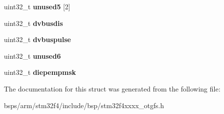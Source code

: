 \begin{DoxyCompactItemize}
uint32\+\_\+t {\bfseries unused5} \mbox{[}2\mbox{]}
\item 
\mbox{\label{structstm32f4__otgfs__dregs__s_a3c600dc5dee45519ea02933d0f11ecda}} 
uint32\+\_\+t {\bfseries dvbusdis}
\item 
\mbox{\label{structstm32f4__otgfs__dregs__s_a086f6898e012a6bb101da80a6026ea97}} 
uint32\+\_\+t {\bfseries dvbuspulse}
\item 
\mbox{\label{structstm32f4__otgfs__dregs__s_a883911a25814def8278ada556d39a34b}} 
uint32\+\_\+t {\bfseries unused6}
\item 
\mbox{\label{structstm32f4__otgfs__dregs__s_aa253fdebfd1b73046aad44cc9585296d}} 
uint32\+\_\+t {\bfseries diepempmsk}
\end{DoxyCompactItemize}


The documentation for this struct was generated from the following file\+:\begin{DoxyCompactItemize}
\item 
bsps/arm/stm32f4/include/bsp/stm32f4xxxx\+\_\+otgfs.\+h\end{DoxyCompactItemize}

